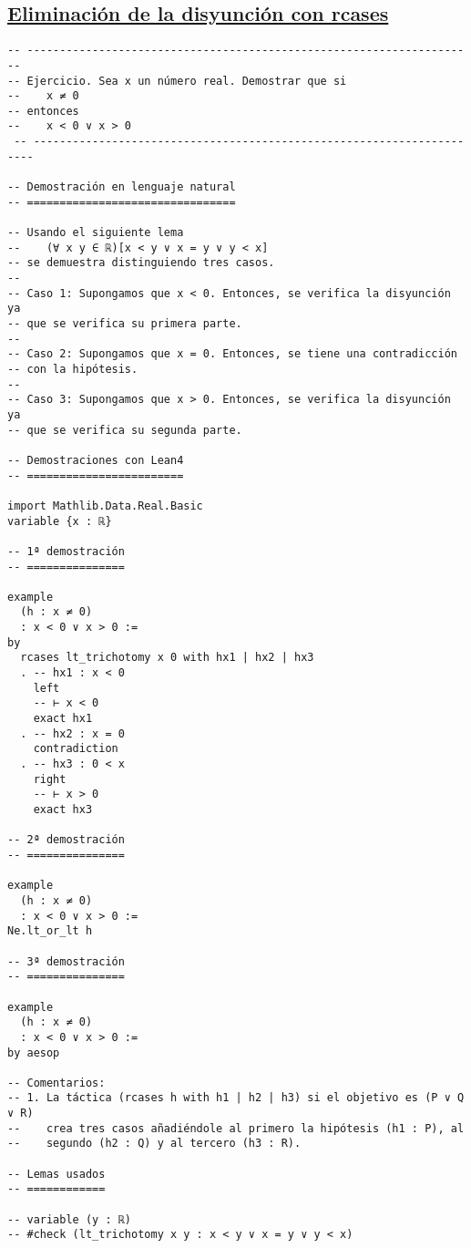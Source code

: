 \subsection{\href{./src/Logica/Eliminacion\_de\_la\_disyuncion\_con\_rcases.lean}{Eliminación de la disyunción con rcases}}
\label{sec:orgf790e40}
\begin{verbatim}
-- ---------------------------------------------------------------------
-- Ejercicio. Sea x un número real. Demostrar que si
--    x ≠ 0
-- entonces
--    x < 0 ∨ x > 0
 -- ----------------------------------------------------------------------

-- Demostración en lenguaje natural
-- ================================

-- Usando el siguiente lema
--    (∀ x y ∈ ℝ)[x < y ∨ x = y ∨ y < x]
-- se demuestra distinguiendo tres casos.
--
-- Caso 1: Supongamos que x < 0. Entonces, se verifica la disyunción ya
-- que se verifica su primera parte.
--
-- Caso 2: Supongamos que x = 0. Entonces, se tiene una contradicción
-- con la hipótesis.
--
-- Caso 3: Supongamos que x > 0. Entonces, se verifica la disyunción ya
-- que se verifica su segunda parte.

-- Demostraciones con Lean4
-- ========================

import Mathlib.Data.Real.Basic
variable {x : ℝ}

-- 1ª demostración
-- ===============

example
  (h : x ≠ 0)
  : x < 0 ∨ x > 0 :=
by
  rcases lt_trichotomy x 0 with hx1 | hx2 | hx3
  . -- hx1 : x < 0
    left
    -- ⊢ x < 0
    exact hx1
  . -- hx2 : x = 0
    contradiction
  . -- hx3 : 0 < x
    right
    -- ⊢ x > 0
    exact hx3

-- 2ª demostración
-- ===============

example
  (h : x ≠ 0)
  : x < 0 ∨ x > 0 :=
Ne.lt_or_lt h

-- 3ª demostración
-- ===============

example
  (h : x ≠ 0)
  : x < 0 ∨ x > 0 :=
by aesop

-- Comentarios:
-- 1. La táctica (rcases h with h1 | h2 | h3) si el objetivo es (P ∨ Q ∨ R)
--    crea tres casos añadiéndole al primero la hipótesis (h1 : P), al
--    segundo (h2 : Q) y al tercero (h3 : R).

-- Lemas usados
-- ============

-- variable (y : ℝ)
-- #check (lt_trichotomy x y : x < y ∨ x = y ∨ y < x)
\end{verbatim}


